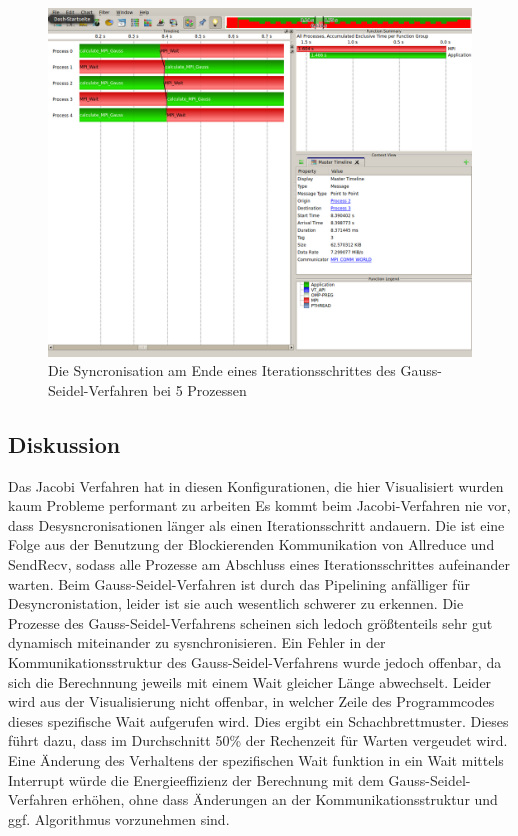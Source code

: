 \documentclass[a4paper,12pt]{scrartcl}
\begin{document}
\begin{figure}[hr!]
 \includegraphics[scale=0.45]{./5_4_GS/Syncronize.png}
 \caption{Die Syncronisation am Ende eines Iterationsschrittes des Gauss-Seidel-Verfahren bei 5 Prozessen}
\end{figure}

\newpage
\FloatBarrier
\subsection{Diskussion}
Das Jacobi Verfahren hat in diesen Konfigurationen, die hier Visualisiert wurden kaum Probleme performant zu arbeiten Es kommt beim Jacobi-Verfahren nie vor, dass Desysncronisationen länger als einen Iterationsschritt andauern. Die ist eine Folge aus der Benutzung der Blockierenden Kommunikation von Allreduce und SendRecv, sodass alle Prozesse am Abschluss eines Iterationsschrittes aufeinander warten. 
Beim Gauss-Seidel-Verfahren ist durch das Pipelining anfälliger für Desyncronistation, leider ist sie auch wesentlich schwerer zu erkennen. Die Prozesse des Gauss-Seidel-Verfahrens scheinen sich ledoch größtenteils sehr gut dynamisch miteinander zu sysnchronisieren.
Ein Fehler in der Kommunikationsstruktur des Gauss-Seidel-Verfahrens wurde jedoch offenbar, da sich die Berechnnung jeweils mit einem Wait gleicher Länge abwechselt. Leider wird aus der Visualisierung nicht offenbar, in welcher Zeile des Programmcodes dieses spezifische Wait aufgerufen wird. Dies ergibt ein Schachbrettmuster. Dieses führt dazu, dass im Durchschnitt 50\% der Rechenzeit für Warten vergeudet wird. Eine Änderung des Verhaltens der spezifischen Wait funktion in ein Wait mittels Interrupt würde die Energieeffizienz der Berechnung mit dem Gauss-Seidel-Verfahren erhöhen, ohne dass Änderungen an der Kommunikationsstruktur und ggf. Algorithmus vorzunehmen sind.  
\end{document}
